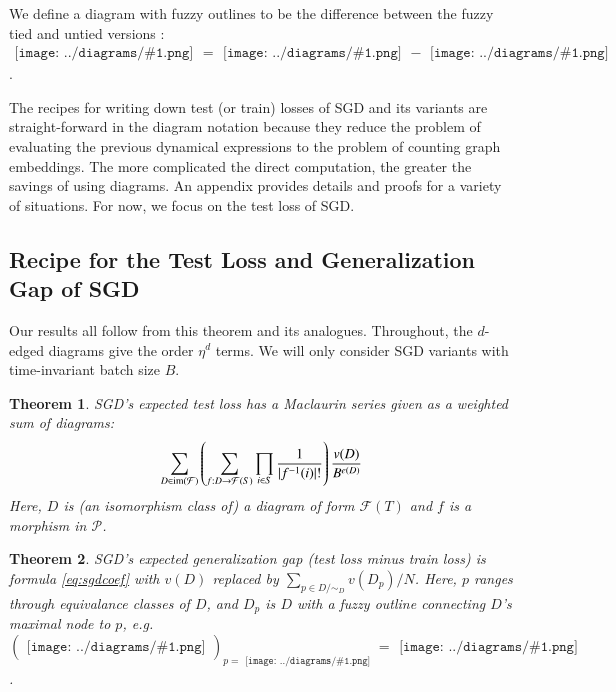 \documentclass{article}
\newtheorem{thm}{Theorem}
\newcommand{\Free}{\mathcal{F}}
\newcommand{\image}{\text{\textnormal{im}}}
\newcommand{\Pp}{\mathcal{P}}
\newcommand{\sdia}[1]{\begin{gathered}\texttt{[image: ../diagrams/\#1.png]}\end{gathered}}
\begin{document}
        We define a diagram with fuzzy outlines to be the difference between
        the fuzzy tied and untied versions : $\sdia{c(01-2)(01-12)} =
        \sdia{(01-2)(01-12)}-\sdia{(0-1-2)(01-12)}$. 
        
        The recipes for writing down test (or train) losses of SGD and its
        variants are straight-forward in the diagram notation because they
        reduce the problem of evaluating the previous dynamical expressions to
        the problem of counting graph embeddings.  The more complicated the
        direct computation, the greater the savings of using diagrams.  An
        appendix provides details and proofs for a variety of situations.  For
        now, we focus on the test loss of SGD.
    

    \subsection{Recipe for the Test Loss and Generalization Gap of SGD}

        Our results all follow from this theorem and its analogues.
        Throughout, the $d$-edged diagrams give the order $\eta^d$ terms.  We
        will only consider SGD variants with time-invariant batch size $B$. 
        \begin{thm} \label{thm:test}
            SGD's expected test loss has a Maclaurin series
            given as a weighted sum of diagrams:
            \begin{equation}\label{eq:sgdcoef}
                \sum_{D \in \image(\Free)}
                \left(
                    \sum_{f: D\to\Free(S)}
                    \prod_{i\in S} \frac{1}{|f^{-1}(i)|!}
                \right)
                \frac{v(D)}{B^{e(D)}}
            \end{equation}
            Here, $D$ is (an isomorphism class of) a diagram of form
            $\Free(T)$ and $f$ is a morphism in $\Pp$.
        \end{thm}
        \begin{thm}
            SGD's expected generalization gap (test loss minus train loss) is
            formula \ref{eq:sgdcoef} with $v(D)$ replaced by
            $
                \sum_{p \in D/\sim_D} v(D_p)/N
            $.
            Here, $p$ ranges through equivalance classes of $D$, and $D_p$ is $D$
            with a fuzzy outline connecting $D$'s maximal node to $p$,
            e.g. $(\sdia{(0-1)(01)})_{p=\sdia{(0)()}} = \sdia{c(01)(01)}$.
        \end{thm}
    
\end{document}
